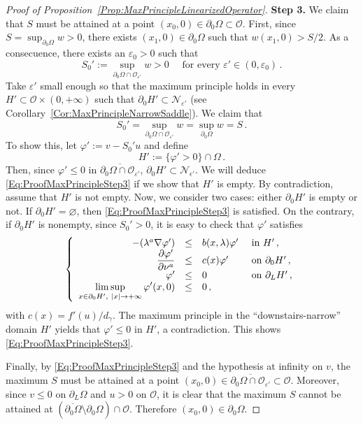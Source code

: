 \documentclass[12pt,reqno]{amsart}
\theoremstyle{definition}
\theoremstyle{remark}
\newcommand{\ncal}{\mathcal{N}}
\newcommand{\ocal}{\mathcal{O}}
\newcommand{\s}{\gamma}
\newcommand\beqc[1]{\left\{\begin{array}{#1}}
\newcommand\eeqc{\end{array} \right.}
\def\PDEsystem{rcll}
\let\div\relax
\DeclareMathOperator{\div}{div}
\def\ds{\displaystyle}
\numberwithin{equation}{section}
\begin{document}
\begin{proof}[Proof of Proposition~\ref{Prop:MaxPrincipleLinearizedOperator}]
\textbf{Step 3.}
We claim that $S$ must be attained at a point $(x_0, 0) \in \partial_0 \Omega\subset \ocal$. First, since $S=\sup_{\partial_0 \Omega } w >0$, there exists $(x_1,0)\in \partial_0\Omega$ such that $w(x_1,0)>S/2$. As a consecuence, there exists an $\varepsilon_0>0$ such that
$$
S_0' :=\sup_{\partial_0 \Omega \cap \ocal_{\varepsilon'}} w > 0 \quad \text{ for every } \varepsilon' \in (0,\varepsilon_0)\,.
$$
Take $\varepsilon'$ small enough so that the maximum principle holds in every $H'\subset \ocal \times (0,+\infty)$ such that $\partial_0 H' \subset \ncal_{\varepsilon'}$ (see Corollary~\ref{Cor:MaxPrincipleNarrowSaddle}). We claim that
\begin{equation}
\label{Eq:ProofMaxPrincipleStep3}
S_0' =\sup_{\partial_0 \Omega \cap \ocal_{\varepsilon'}} w =\sup_{\partial_0 \Omega } w = S\,.
\end{equation}
To show this, let $\varphi' := v - S_0'u$ and define 
$$
H' := \{\varphi' > 0\}\cap \Omega\,.
$$
Then, since $\varphi' \leq 0$ in $\overline{\partial_0 \Omega \cap \ocal_{\varepsilon'}}$, $\partial_0 H' \subset \ncal_{\epsilon'}$. We will deduce \eqref{Eq:ProofMaxPrincipleStep3} if we show that $H'$ is empty. By contradiction, assume that $H'$ is not empty. Now, we consider two cases: either $\partial_0H'$ is empty or not. If $\partial_0H'=\varnothing$, then \eqref{Eq:ProofMaxPrincipleStep3} is satisfied. On the contrary, if  $\partial_0H'$ is nonempty, since $S_0'>0$, it is easy to check that $\varphi'$ satisfies
$$
\beqc{\PDEsystem}
-\div(\lambda^a \nabla \varphi') &\leq& b(x,\lambda)\varphi' & \text{ in } H' \,, \\
\dfrac{\partial \varphi'}{\partial \nu^a}  &\leq & c(x) \varphi' & \text{ on } \partial_0 H' \,, \\
\varphi' & \leq & 0 & \text{ on } \partial_L H'  \,,\\
\ds \limsup_{x \in \partial_0 H',\ |x|\to +\infty} \varphi'(x,0) & \leq & 0\,,
\eeqc
$$
with $c(x) = f'(u) / d_\s$. The maximum principle in the ``downstairs-narrow'' domain $H'$ yields that $\varphi' \leq 0$ in $H'$, a contradiction. This shows \eqref{Eq:ProofMaxPrincipleStep3}. 

Finally, by \eqref{Eq:ProofMaxPrincipleStep3} and the hypothesis at infinity on $v$, the maximum $S$ must be attained at a point $(x_0,0)\in \overline{\partial_0\Omega \cap \ocal_{\varepsilon'}}\subset \ocal$. Moreover, since $v\leq 0$ on $\partial_L\Omega$ and $u>0$ on $\ocal$, it is clear that the maximum $S$ cannot be attained at $(\overline{\partial_0\Omega} \setminus \partial_0 \Omega)\cap \ocal$.
Therefore $(x_0,0)\in\partial_0\Omega$.


\end{proof}
\end{document}
